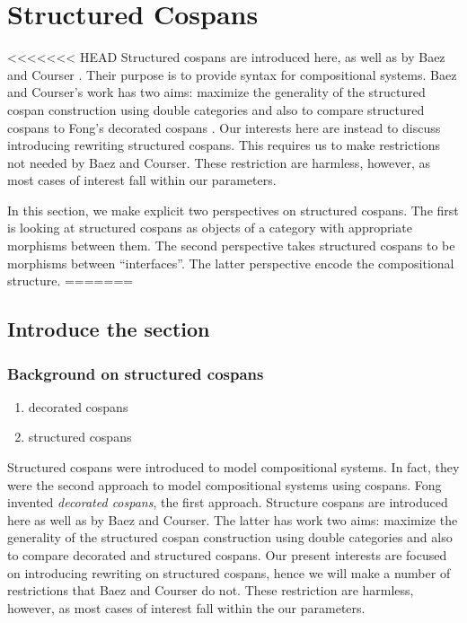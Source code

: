 \documentclass{amsart}
\theoremstyle{remark}
\theoremstyle{definition}
\begin{document}

\section{Structured Cospans}
\label{sec:StrCsp}

<<<<<<< HEAD
Structured cospans are introduced here, as well as by Baez and Courser
\cite{StrCsp}. Their purpose is to provide syntax for compositional
systems. Baez and Courser's work has two aims: maximize the generality
of the structured cospan construction using double categories and also
to compare structured cospans to Fong's decorated cospans
\cite{DecorCsp}. Our interests here are instead to discuss introducing
rewriting structured cospans. This requires us to make restrictions
not needed by Baez and Courser.  These restriction are harmless,
however, as most cases of interest fall within our parameters.

In this section, we make explicit two perspectives on structured
cospans.  The first is looking at structured cospans as objects of a
category with appropriate morphisms between them. The second
perspective takes structured cospans to be morphisms between
``interfaces''.  The latter perspective encode the compositional
structure.
=======

\subsection{Introduce the section}
\label{sec-2-1}

\subsubsection{Background on structured cospans}
\label{sec-2-1-1}
\begin{enumerate}
\item decorated cospans
\label{sec-2-1-1-1}
\item structured cospans
\label{sec-2-1-1-2}
\end{enumerate}

Structured cospans were introduced to model compositional systems. In
fact, they were the second approach to model compositional systems
using cospans. Fong invented \emph{decorated cospans},
%
%
the first approach.  Structure cospans are
introduced here as well as by Baez and Courser.
%
%
The latter has work two aims: maximize the
generality of the structured cospan construction using double
categories and also to compare decorated and structured cospans. Our
present interests are focused on introducing rewriting on structured
cospans, hence we will make a number of restrictions that Baez and
Courser do not.  These restriction are harmless, however, as most
cases of interest fall within the our parameters.
\end{document}
